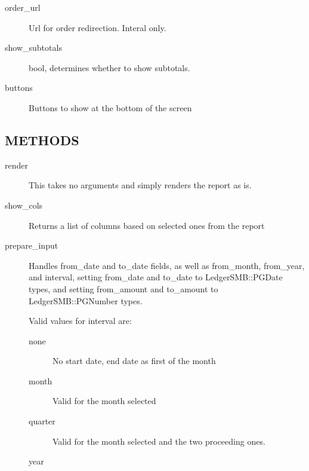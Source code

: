 \begin{description}
\begin{description}
\begin{description}
\begin{description}
\begin{description}
\begin{description}
\begin{description}
\begin{description}
\begin{description}
\begin{description}
\begin{description}
\item[{order\_url}] \mbox{}

Url for order redirection.  Interal only.


\item[{show\_subtotals}] \mbox{}

bool, determines whether to show subtotals.


\item[{buttons}] \mbox{}

Buttons to show at the bottom of the screen

\end{description}
\subsection*{METHODS\label{LedgerSMB::DBObject::Report_METHODS}}
\begin{description}

\item[{render}] \mbox{}

This takes no arguments and simply renders the report as is.


\item[{show\_cols}] \mbox{}

Returns a list of columns based on selected ones from the report


\item[{prepare\_input}] \mbox{}

Handles from\_date and to\_date fields, as well as from\_month, from\_year, and 
interval, setting from\_date and to\_date to LedgerSMB::PGDate types, and setting
from\_amount and to\_amount to LedgerSMB::PGNumber types.



Valid values for interval are:

\begin{description}

\item[{none}] \mbox{}

No start date, end date as first of the month


\item[{month}] \mbox{}

Valid for the month selected


\item[{quarter}] \mbox{}

Valid for the month selected and the two proceeding ones.


\item[{year}] \mbox{}


\end{description}
\end{description}
\end{description}
\end{description}
\end{description}
\end{description}
\end{description}
\end{description}
\end{description}
\end{description}
\end{description}
\end{description}

